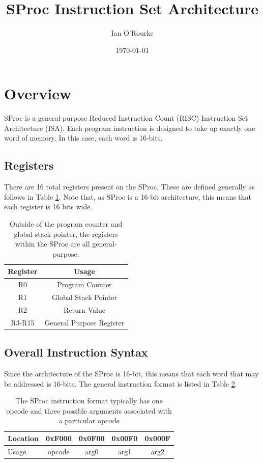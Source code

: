 \documentclass{article}
\title{SProc Instruction Set Architecture}
\author{Ian O'Rourke}
\date{\today \\ \titlelogoimage}
\begin{document}
\maketitle

\section{Overview}

SProc is a general-purpose Reduced Instruction Count (RISC) Instruction Set Architecture (ISA). Each program instruction is designed to take up exactly one word of memory. In this case, each word is 16-bits.

\subsection{Registers}

There are 16 total registers present on the SProc. These are defined generally as follows in Table \ref{table:register-setup}. Note that, as SProc is a 16-bit architecture, this means that each register is 16 bits wide.

\begin{table}[h!]
	\centering
	\begin{tabular}{c|c}
		\hline
		Register & Usage \\
		\hline
		R0 & Program Counter \\
		R1 & Global Stack Pointer \\
		R2 & Return Value \\
		R3-R15 & General Purpose Register \\
		\hline
	\end{tabular}
	\caption{Outside of the program counter and global stack pointer, the registers within the SProc are all general-purpose.}
	\label{table:register-setup}
\end{table}

\subsection{Overall Instruction Syntax}

Since the architecture of the SProc is 16-bit, this means that each word that may be addressed is 16-bits. The general instruction format is listed  in Table \ref{table:instruction-formatting}.

\begin{table}[h!]
	\centering
	\begin{tabular}{l|cccc}
		\hline
		Location & 0xF000 & 0x0F00 & 0x00F0 & 0x000F \\
		\hline
		Usage & opcode & arg0 & arg1 & arg2 \\
		\hline
	\end{tabular}
	\caption{The SProc instruction format typically has one opcode and three possible arguments associated with a particular opcode}
	\label{table:instruction-formatting}
\end{table}
\end{document}

